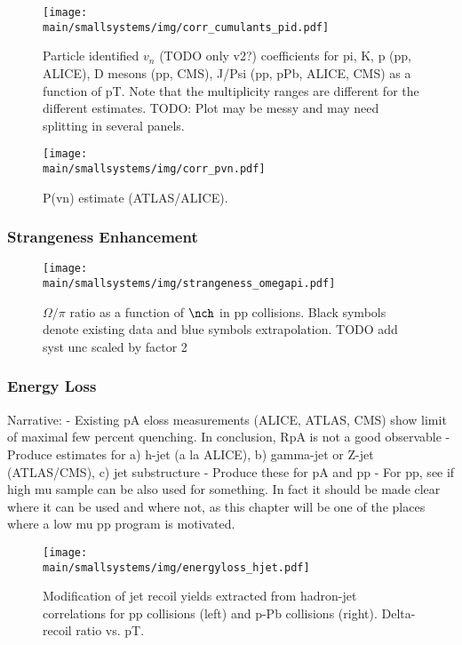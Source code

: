\documentclass[../report.tex]{subfiles}
\providecommand{\main}{..}
\begin{document}
\begin{figure}[ht]
\centering
\texttt{[image: \\main/smallsystems/img/corr\_cumulants\_pid.pdf]}
\caption{Particle identified $v_n$ (TODO only v2?) coefficients for pi, K, p (pp, ALICE), D mesons (pp, CMS), J/Psi (pp, pPb, ALICE, CMS) as a function of pT. Note that the multiplicity ranges are different for the different estimates. TODO: Plot may be messy and may need splitting in several panels.}
\label{fig:smallsystems_corr_cumulants_pid}
\end{figure}

\begin{figure}[ht]
\centering
\texttt{[image: \\main/smallsystems/img/corr\_pvn.pdf]}
\caption{P(vn) estimate (ATLAS/ALICE).}
\label{fig:smallsystems_corr_pvn}
\end{figure}


\subsubsection{Strangeness Enhancement}

\begin{figure}[ht]
\centering
\texttt{[image: \\main/smallsystems/img/strangeness\_omegapi.pdf]}
\caption{$\Omega/\pi$ ratio as a function of $\nch$ in pp collisions. Black symbols denote existing data \cite{ALICE:2017jyt} and blue symbols extrapolation. TODO add syst unc scaled by factor 2}
\label{fig:smallsystems_strangeness_omega_pi}
\end{figure}

\subsubsection{Energy Loss}

Narrative: 
- Existing pA eloss measurements (ALICE, ATLAS, CMS) show limit of maximal few percent quenching. In conclusion, RpA is not a good observable
- Produce estimates for a) h-jet (a la ALICE), b) gamma-jet or Z-jet (ATLAS/CMS), c) jet substructure
- Produce these for pA and pp
- For pp, see if high mu sample can be also used for something. In fact it should be made clear where it can be used and where not, as this chapter will be one of the places where a low mu pp program is motivated.

\begin{figure}[ht]
\centering
\texttt{[image: \\main/smallsystems/img/energyloss\_hjet.pdf]}
\caption{Modification of jet recoil yields extracted from hadron-jet correlations for pp collisions (left) and p-Pb collisions (right). Delta-recoil ratio vs. pT.}
\label{fig:smallsystems_energyloss_hjet}
\end{figure}
\end{document}
